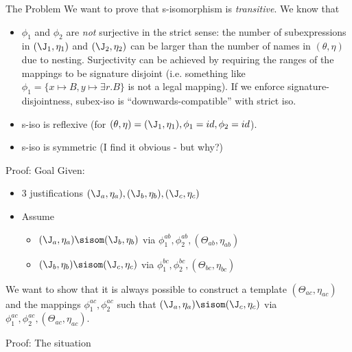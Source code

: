 \documentclass{beamer}
\begin{document}
\begin{frame}{The Problem}
We want to prove that s-isomorphism is \emph{transitive}. We know that
\begin{itemize}
\item $\phi_1$ and $\phi_2$ are \emph{not} surjective in the strict sense: the number of subexpressions  in $(\J_{1}, \eta_1)$ and $(\J_{2}, \eta_2)$ can be larger than the number of names in $(\theta, \eta)$ due to nesting. Surjectivity can be achieved by requiring the ranges of the mappings to be signature disjoint (i.e. something like $\phi_{1}  = \{x \mapsto B, y \mapsto \exists r.B \}$ is not a legal mapping). If we enforce signature-disjointness, subex-iso is ``downwards-compatible'' with strict iso.
\item s-iso is reflexive (for $(\theta, \eta) = (\J_1, \eta_1), \phi_1 = id, \phi_2 = id$).
\item s-iso is symmetric (I find it obvious - but why?)
\end{itemize}

\end{frame}

\begin{frame}{Proof: Goal}
Given:
\begin{itemize}
\item 3 justifications $(\J_{a}, \eta_{a}), (\J_{b}, \eta_{b}) , (\J_{c}, \eta_{c}) $
\item Assume
\begin{itemize}
\item $(\J_{a}, \eta_{a}) \sisom (\J_{b}, \eta_{b}) $ via $\phi^{ab}_{1}, \phi^{ab}_{2}, (\Theta_{ab}, \eta_{ab})$
\item $(\J_{b}, \eta_{b}) \sisom (\J_{c}, \eta_{c}) $ via $\phi^{bc}_{1}, \phi^{bc}_{2}, (\Theta_{bc}, \eta_{bc})$
\end{itemize}
\end{itemize}

We want to show that it is always possible to construct a template $(\Theta_{ac}, \eta_{ac})$ and the mappings $\phi^{ac}_{1}, \phi^{ac}_{2}$ such that  $(\J_{a}, \eta_{a}) \sisom (\J_{c}, \eta_{c}) $ via $\phi^{ac}_{1}, \phi^{ac}_{2}, (\Theta_{ac}, \eta_{ac})$.

\end{frame}

\begin{frame}{Proof: The situation}
\begin{figure}
\centering

\end{figure}

\end{frame}
\end{document}
